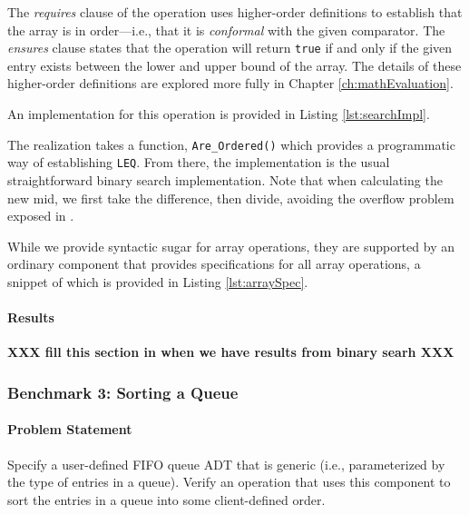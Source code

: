 The \emph{requires} clause of the operation uses higher-order definitions to establish that the array is in order---i.e., that it is \emph{conformal} with the given comparator.  The \emph{ensures} clause states that the operation will return \texttt{true} if and only if the given entry exists between the lower and upper bound of the array.  The details of these higher-order definitions are explored more fully in Chapter \ref{ch:mathEvaluation}.

An implementation for this operation is provided in Listing \ref{lst:searchImpl}.



The realization takes a function, \texttt{Are\_Ordered()} which provides a programmatic way of establishing \texttt{LEQ}.  From there, the implementation is the usual straightforward binary search implementation.  Note that when calculating the new mid, we first take the difference, then divide, avoiding the overflow problem exposed in \cite{thingy}.

While we provide syntactic sugar for array operations, they are supported by an ordinary component that provides specifications for all array operations, a snippet of which is provided in Listing \ref{lst:arraySpec}.



\paragraph{Results} \textbf{XXX fill this section in when we have results from binary searh XXX}

\FloatBarrier
		\subsubsection{Benchmark 3: Sorting a Queue}	%

\paragraph{Problem Statement}Specify a user-defined FIFO queue ADT that is generic (i.e., parameterized by the type of entries in a queue). Verify an operation that uses this component to sort the entries in a queue into some client-defined order.

